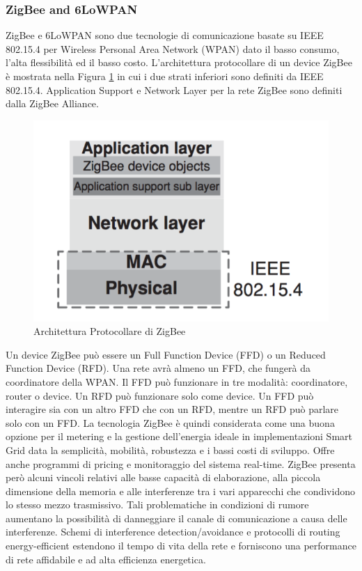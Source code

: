 \subsubsection{ZigBee and 6LoWPAN}
ZigBee e 6LoWPAN sono due tecnologie di comunicazione basate su IEEE 802.15.4 per Wireless Personal Area Network (WPAN) dato il basso consumo, l'alta flessibilità ed il basso costo. L'architettura protocollare di un device ZigBee è mostrata nella Figura \ref{fig:zbprot} in cui i due strati inferiori sono definiti da IEEE 802.15.4. Application Support e Network Layer per la rete ZigBee sono definiti dalla ZigBee Alliance\cite{zb}.
\begin{figure}[h]
	\centering
	\includegraphics[scale=0.350]{imgs/zbprot.png}
	\caption{Architettura Protocollare di ZigBee} \label{fig:zbprot}
\end{figure}
Un device ZigBee può essere un Full Function Device (FFD) o un Reduced Function Device (RFD). Una rete avrà almeno un FFD, che fungerà da coordinatore della WPAN. Il FFD può funzionare in tre modalità: coordinatore, router o device. Un RFD può funzionare solo come device. Un FFD può interagire sia con un altro FFD che con un RFD, mentre un RFD può parlare solo con un FFD.
La tecnologia ZigBee è quindi considerata come una buona opzione per il metering e la gestione dell'energia ideale in implementazioni Smart Grid data la semplicità, mobilità, robustezza e i bassi costi di sviluppo. Offre anche programmi di pricing e monitoraggio del sistema real-time. ZigBee presenta però alcuni vincoli relativi alle basse capacità di elaborazione, alla piccola dimensione della memoria e alle interferenze tra i vari apparecchi che condividono lo stesso mezzo trasmissivo. Tali problematiche in condizioni di rumore aumentano la possibilità di danneggiare il canale di comunicazione a causa delle interferenze. Schemi di interference detection/avoidance e protocolli di routing energy-efficient estendono il tempo di vita della rete e forniscono una performance di rete affidabile e ad alta efficienza energetica.
